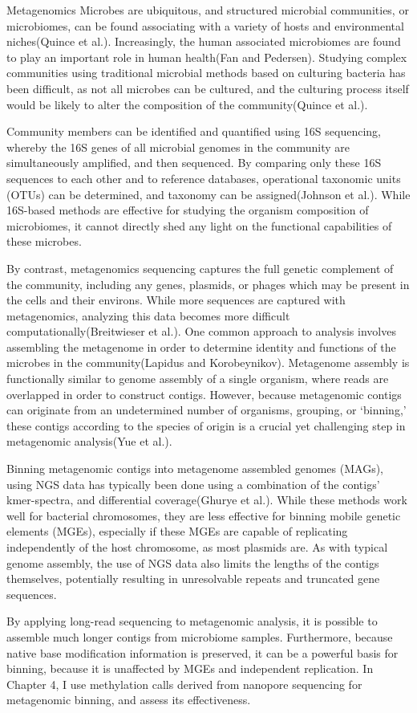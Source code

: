 Metagenomics
Microbes are ubiquitous, and structured microbial communities, or microbiomes, can be found associating with a variety of hosts and environmental niches(Quince et al.). Increasingly, the human associated microbiomes are found to play an important role in human health(Fan and Pedersen). Studying complex communities using traditional microbial methods based on culturing bacteria has been difficult, as not all microbes can be cultured, and the culturing process itself would be likely to alter the composition of the community(Quince et al.).

Community members can be identified and quantified using 16S sequencing, whereby the 16S genes of all microbial genomes in the community are simultaneously amplified, and then sequenced. By comparing only these 16S sequences to each other and to reference databases, operational taxonomic units (OTUs) can be determined, and taxonomy can be assigned(Johnson et al.). While 16S-based methods are effective for studying the organism composition of microbiomes, it cannot directly shed any light on the functional capabilities of these microbes.

By contrast, metagenomics sequencing captures the full genetic complement of the community, including any genes, plasmids, or phages which may be present in the cells and their environs. While more sequences are captured with metagenomics, analyzing this data becomes more difficult computationally(Breitwieser et al.). One common approach to analysis involves assembling the metagenome in order to determine identity and functions of the microbes in the community(Lapidus and Korobeynikov). Metagenome assembly is functionally similar to genome assembly of a single organism, where reads are overlapped in order to construct contigs. However, because metagenomic contigs can originate from an undetermined number of organisms, grouping, or ‘binning,’ these contigs according to the species of origin is a crucial yet challenging step in metagenomic analysis(Yue et al.).

Binning metagenomic contigs into metagenome assembled genomes (MAGs), using NGS data has typically been done using a combination of the contigs’ kmer-spectra, and differential coverage(Ghurye et al.). While these methods work well for bacterial chromosomes, they are less effective for binning mobile genetic elements (MGEs), especially if these MGEs are capable of replicating independently of the host chromosome, as most plasmids are. As with typical genome assembly, the use of NGS data also limits the lengths of the contigs themselves, potentially resulting in unresolvable repeats and truncated gene sequences.

By applying long-read sequencing to metagenomic analysis, it is possible to assemble much longer contigs from microbiome samples. Furthermore, because native base modification information is preserved, it can be a powerful basis for binning, because it is unaffected by MGEs and independent replication. In Chapter 4, I use methylation calls derived from nanopore sequencing for metagenomic binning, and assess its effectiveness.
